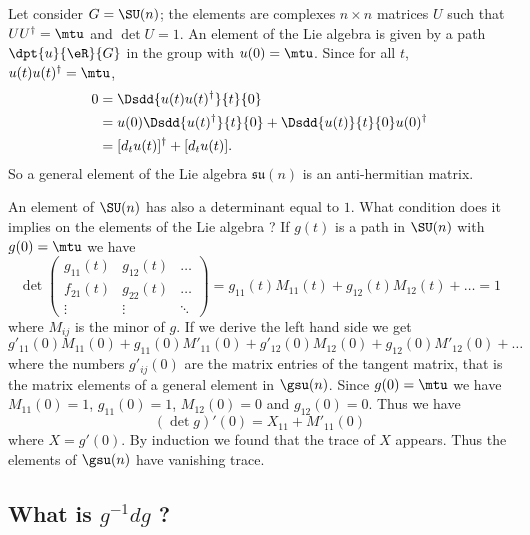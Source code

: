 Let consider $G=\SU(n)$; the elements are complexes $n\times n$ matrices $U$ such that $UU^{\dag}=\mtu$ and $\det U=1$. An element of the Lie algebra is given by a path $\dpt{u}{\eR}{G}$ in the group with $u(0)=\mtu$. Since for all $t$, $u(t)u(t)^{\dag}=\mtu$,
\begin{equation}
\begin{split}
  0&=\Dsdd{u(t)u(t)^{\dag}}{t}{0}\\
   &=u(0)\Dsdd{u(t)^{\dag}}{t}{0}+\Dsdd{u(t)}{t}{0}u(0)^{\dag}\\
   &=[d_tu(t)]^{\dag}+[d_tu(t)].
\end{split}
\end{equation}
So a general element of the Lie algebra $\mathfrak{su}(n)$ is an anti-hermitian matrix. 

An element of \( \SU(n)\) has also a determinant equal to \( 1\). What condition does it implies on the elements of the Lie algebra ? If \( g(t)\) is a path in \( \SU(n)\) with \( g(0)=\mtu\) we have
\begin{equation}
    \det\begin{pmatrix}
        g_{11}(t)    &   g_{12}(t)    &   \ldots    \\
        f_{21}(t)    &   g_{22}(t)    &   \ldots    \\
        \vdots    &   \vdots    &   \ddots
    \end{pmatrix}=g_{11}(t)M_{11}(t)+g_{12}(t)M_{12}(t)+\ldots=1
\end{equation}
where \( M_{ij}\) is the minor of \( g\). If we derive the left hand side we get
\begin{equation}
    g'_{11}(0)M_{11}(0)+g_{11}(0)M'_{11}(0)+g'_{12}(0)M_{12}(0)+g_{12}(0)M'_{12}(0)+\ldots
\end{equation}
where the numbers \( g'_{ij}(0)\) are the matrix entries of the tangent matrix, that is the matrix elements of a general element in \( \gsu(n)\). Since \( g(0)=\mtu\) we have \( M_{11}(0)=1\), \( g_{11}(0)=1\), \( M_{12}(0)=0\) and \( g_{12}(0)=0\). Thus we have
\begin{equation}
    (\det g)'(0)=X_{11}+M'_{11}(0)
\end{equation}
where \( X=g'(0)\). By induction we found that the trace of \( X\) appears. Thus the elements of \( \gsu(n)\) have vanishing trace.


\subsection{What is  \texorpdfstring{$g^{-1} dg$}{g-1dg} ?}\label{SubSecgmudg}

